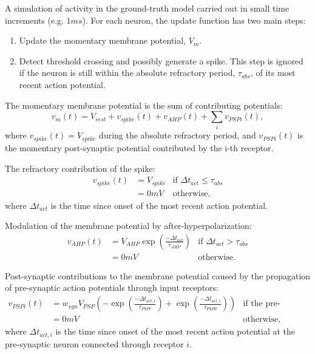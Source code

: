 \documentclass{ldr-article}
\begin{document}
A simulation of activity in the ground-truth model carried out in small time increments (e.g. $1 ms$). For each neuron, the update function has two main steps:
\begin{enumerate}
	\item Update the momentary membrane potential, $V_m$.
	\item Detect threshold crossing and possibly generate a spike. This step is ignored if the neuron is still within the absolute refractory period, $\tau_{abs}$, of its most recent action potential.
\end{enumerate}

The momentary membrane potential is the sum of contributing potentials:
\begin{equation}\label{eq:membrane-potential}
	v_m(t) = V_{rest} + v_{spike}(t) + v_{AHP}(t) + \sum_i{v_{PSPi}(t)},
\end{equation}
where $v_{spike}(t) = V_{spike}$ during the absolute refractory period, and $v_{PSPi}(t)$ is the momentary post-synaptic potential contributed by the i-th receptor.

The refractory contribution of the spike:
\begin{eqnarray}
	v_{spike}(t) 	& = V_{spike} & \textrm{if } \Delta t_{act} \le \tau_{abs} \\
	& = 0 mV & \textrm{otherwise,} \nonumber
\end{eqnarray}
where $\Delta t_{act}$ is the time since onset of the most recent action potential.

Modulation of the membrane potential by after-hyperpolarization:
\begin{eqnarray}
	v_{AHP}(t)		& = V_{AHP} \exp(\frac{-\Delta t_{act}}{\tau_{AHP}}) & \textrm{if } \Delta t_{act} > \tau_{abs} \\
	& = 0 mV & \textrm{otherwise.} \nonumber
\end{eqnarray}

Post-synaptic contributions to the membrane potential caused by the propagation of pre-synaptic action potentials through input receptors:
\begin{eqnarray}
	v_{PSPi}(t)		& = w_{syn} V_{PSP} ( -\exp(\frac{-\Delta t_{act,i}}{\tau_{PSPr}}) + \exp(\frac{-\Delta t_{act,i}}{\tau_{PSPd}}) ) & \textrm{if the pre-synaptic neuron has spiked.} \\
	& = 0 mV & \textrm{otherwise,} \nonumber
\end{eqnarray}
where $\Delta t_{act,i}$ is the time since onset of the most recent action potential at the pre-synaptic neuron connected through receptor $i$.
\end{document}
